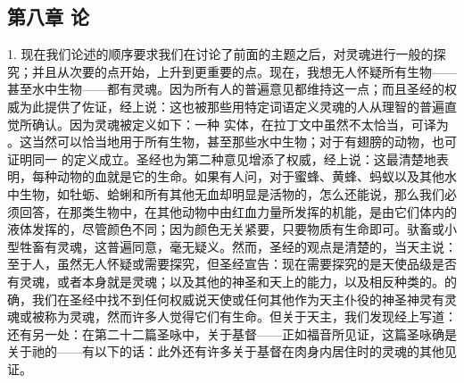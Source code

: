 
\subsection{第八章 论}

1. 现在我们论述的顺序要求我们在讨论了前面的主题之后，对灵魂进行一般的探究；并且从次要的点开始，上升到更重要的点。现在，我想无人怀疑所有生物——甚至水中生物——都有灵魂。因为所有人的普遍意见都维持这一点；而且圣经的权威为此提供了佐证，经上说：这也被那些用特定词语定义灵魂的人从理智的普遍直觉所确认。因为灵魂被定义如下：一种  实体，在拉丁文中虽然不太恰当，可译为 。这当然可以恰当地用于所有生物，甚至那些水中生物；对于有翅膀的动物，也可证明同一  的定义成立。圣经也为第二种意见增添了权威，经上说：这最清楚地表明，每种动物的血就是它的生命。如果有人问，对于蜜蜂、黄蜂、蚂蚁以及其他水中生物，如牡蛎、蛤蜊和所有其他无血却明显是活物的，怎么还能说，那么我们必须回答，在那类生物中，在其他动物中由红血力量所发挥的机能，是由它们体内的液体发挥的，尽管颜色不同；因为颜色无关紧要，只要物质有生命即可。驮畜或小型牲畜有灵魂，这普遍同意，毫无疑义。然而，圣经的观点是清楚的，当天主说：至于人，虽然无人怀疑或需要探究，但圣经宣告：现在需要探究的是天使品级是否有灵魂，或者本身就是灵魂；以及其他的神圣和天上的能力，以及相反种类的。的确，我们在圣经中找不到任何权威说天使或任何其他作为天主仆役的神圣神灵有灵魂或被称为灵魂，然而许多人觉得它们有生命。但关于天主，我们发现经上写道：还有另一处：在第二十二篇圣咏中，关于基督——正如福音所见证，这篇圣咏确是关于祂的——有以下的话：此外还有许多关于基督在肉身内居住时的灵魂的其他见证。\par


